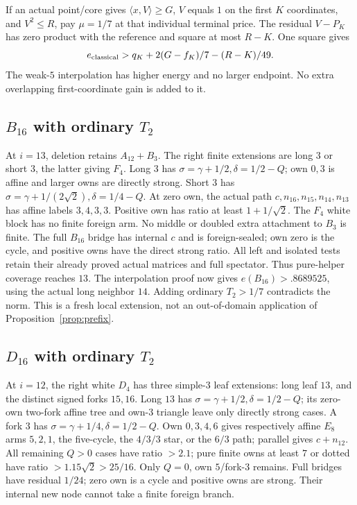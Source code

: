 \documentclass[11pt]{article}
\theoremstyle{definition}
\theoremstyle{remark}
\newcommand{\ip}[2]{\langle #1,#2\rangle}
\begin{document}
If an actual point/core gives \(\ip{x}{V}\geq G\),
\(V\) equals \(1\) on the first \(K\) coordinates,
and \(V^2\leq R\), pay \(\mu=1/7\) at that
individual terminal price. The residual \(V-P_K\)
has zero product with the reference and square
at most \(R-K\). One square gives
\begin{equation}\label{app:eq:localpayment}
 e_{\rm classical}>
 q_K+2(G-f_K)/7-(R-K)/49.
\end{equation}
The weak-\(5\) interpolation has higher energy
and no larger endpoint. No extra overlapping
first-coordinate gain is added to it.

\subsection{\(B_{16}\) with ordinary \(T_2\)}
At \(i=13\), deletion retains \(A_{12}+B_3\).
The right finite extensions are long \(3\) or
short \(3\), the latter giving \(F_4\).
Long \(3\) has
\(\sigma=\gamma+1/2,\delta=1/2-Q\);
own \(0,3\) is affine and larger owns are
directly strong.
Short \(3\) has
\(\sigma=\gamma+1/(2\sqrt2),\delta=1/4-Q\).
At zero own, the actual path
\(c,n_{16},n_{15},n_{14},n_{13}\) has affine
labels \(3,4,3,3\).
Positive own has ratio at least
\(1+1/\sqrt2\).
The \(F_4\) white block has no finite foreign
arm. No middle or doubled extra attachment
to \(B_3\) is finite.
The full \(B_{16}\) bridge has internal \(c\)
and is foreign-sealed; own zero is the cycle,
and positive owns have the direct strong ratio.
All left and isolated tests retain their
already proved actual matrices and full spectator.
Thus pure-helper coverage reaches \(13\).
The interpolation proof now gives
\(e(B_{16})>.8689525\), using the actual long
neighbor \(14\). Adding ordinary \(T_2>1/7\)
contradicts the norm. This is a fresh local
extension, not an out-of-domain application
of Proposition~\ref{prop:prefix}.

\subsection{\(D_{16}\) with ordinary \(T_2\)}
At \(i=12\), the right white \(D_4\) has
three simple-\(3\) leaf extensions: long leaf
\(13\), and the distinct signed forks \(15,16\).
Long \(13\) has
\(\sigma=\gamma+1/2,\delta=1/2-Q\);
its zero-own two-fork affine tree and own-\(3\)
triangle leave only directly strong cases.
A fork \(3\) has
\(\sigma=\gamma+1/4,\delta=1/2-Q\).
Own \(0,3,4,6\) gives respectively affine
\(E_8\) arms \(5,2,1\), the five-cycle,
the \(4/3/3\) star, or the \(6/3\) path;
parallel gives \(c+n_{12}\).
All remaining \(Q>0\) cases have ratio \(>2.1\);
pure finite owns at least \(7\) or dotted have
ratio \(>1.15\sqrt2>25/16\).
Only \(Q=0\), own \(5\)/fork-\(3\) remains.
Full bridges have residual \(1/24\);
zero own is a cycle and positive owns are
strong. Their internal new node cannot
take a finite foreign branch.
\end{document}
